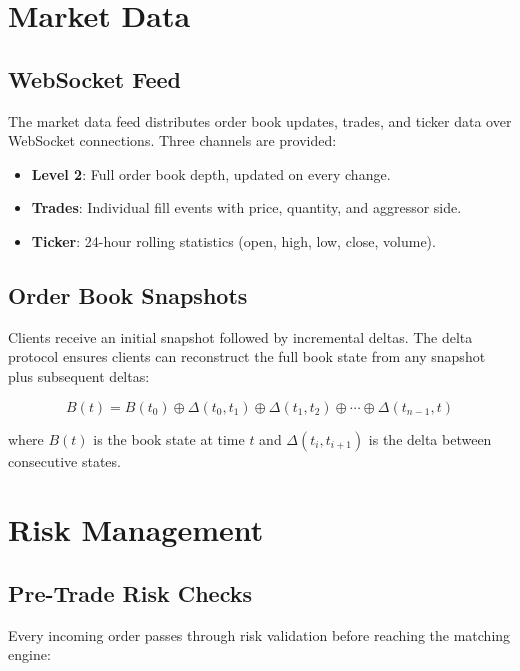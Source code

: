 \documentclass[11pt,a4paper]{article}
\begin{document}
\section{Market Data}

\subsection{WebSocket Feed}

The market data feed distributes order book updates, trades, and ticker data over WebSocket connections. Three channels are provided:

\begin{itemize}
    \item \textbf{Level 2}: Full order book depth, updated on every change.
    \item \textbf{Trades}: Individual fill events with price, quantity, and aggressor side.
    \item \textbf{Ticker}: 24-hour rolling statistics (open, high, low, close, volume).
\end{itemize}

\subsection{Order Book Snapshots}

Clients receive an initial snapshot followed by incremental deltas. The delta protocol ensures clients can reconstruct the full book state from any snapshot plus subsequent deltas:

\begin{equation}
    B(t) = B(t_0) \oplus \Delta(t_0, t_1) \oplus \Delta(t_1, t_2) \oplus \cdots \oplus \Delta(t_{n-1}, t)
\end{equation}

where $B(t)$ is the book state at time $t$ and $\Delta(t_i, t_{i+1})$ is the delta between consecutive states.

\section{Risk Management}

\subsection{Pre-Trade Risk Checks}

Every incoming order passes through risk validation before reaching the matching engine:
\end{document}

